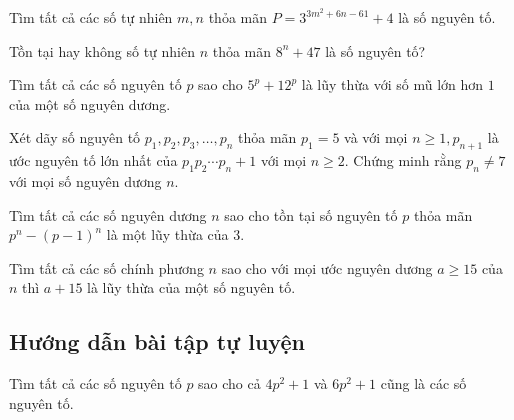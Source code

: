 \begin{btt}
Tìm tất cả các số tự nhiên $m,n$ thỏa mãn $P=3^{3m^2+6n-61}+4$ là số nguyên tố.
\end{btt}

\begin{btt}
Tồn tại hay không số tự nhiên \(n\) thỏa mãn \(8^n+47\) là số nguyên tố?
\end{btt}

\begin{btt}
Tìm tất cả các số nguyên tố $p$ sao cho $5^{p}+12^{p}$ là lũy thừa với số mũ lớn hơn $1$ của một số nguyên dương.
\end{btt}

\begin{btt}
Xét dãy số nguyên tố $p_1,p_2,p_3,\ldots, p_n$ thỏa mãn $p_1=5$ và với mọi $n \geq 1, p_{n+1}$ là ước nguyên tố lớn nhất của $p_{1} p_2\cdots p_n+1$ với mọi $n\ge 2.$ Chứng minh rằng $p_n\ne 7$ với mọi số nguyên dương $n.$

\end{btt}

\begin{btt}
Tìm tất cả các số nguyên dương \(n\) sao cho tồn tại số nguyên tố \(p\) thỏa mãn  $p^n-(p-1)^n$ là một lũy thừa của \(3\).
\end{btt}

\begin{btt}
Tìm tất cả các số chính phương $n$ sao cho với mọi ước nguyên dương $a\ge 15$ của $n$ thì $a+15$ là lũy thừa của một số nguyên tố.
\end{btt}

\subsection{Hướng dẫn bài tập tự luyện}

\begin{gbtt}
Tìm tất cả các số nguyên tố $p$ sao cho cả $4p^2+1$ và $6p^2+1$ cũng là các số nguyên tố.
\end{gbtt} 

